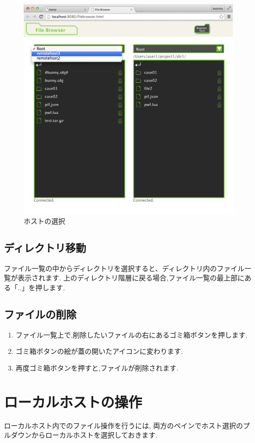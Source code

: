 \documentclass[a4paper,10pt,oneside]{jsbook}
\begin{document}
\begin{figure}[htbp]
	\begin{center}
		\includegraphics[width=12.0cm]{image/filebrowser_007.png}
	\end{center}
	\caption{ホストの選択}
	\label{fig:filebrowser_host}
\end{figure}


\subsection{ディレクトリ移動}
ファイル一覧の中からディレクトリを選択すると、ディレクトリ内のファイル一覧が表示されます.
上のディレクトリ階層に戻る場合,ファイル一覧の最上部にある「..」を押します.

\subsection{ファイルの削除}
\begin{enumerate}
	\item ファイル一覧上で,削除したいファイルの右にあるゴミ箱ボタンを押します.
	\item ゴミ箱ボタンの絵が蓋の開いたアイコンに変わります.
	\item 再度ゴミ箱ボタンを押すと,ファイルが削除されます.
\end{enumerate}

\section{ローカルホストの操作}
ローカルホスト内でのファイル操作を行うには,
両方のペインでホスト選択のプルダウンからローカルホストを選択しておきます.
\end{document}
